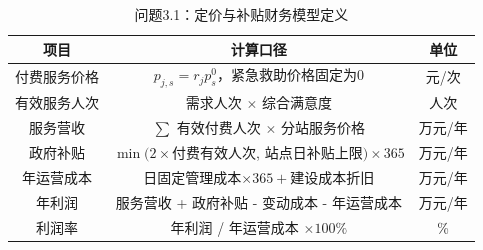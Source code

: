 \begin{table}[h]
\centering
\caption{问题3.1：定价与补贴财务模型定义}
\begin{tabular}{|c|c|c|}
\hline
项目 & 计算口径 & 单位 \\
\hline
付费服务价格 & $p_{j,s}=r_j p^0_s$，紧急救助价格固定为0 & 元/次 \\
有效服务人次 & 需求人次 $\times$ 综合满意度 & 人次 \\
服务营收 & $\sum$ 有效付费人次 $\times$ 分站服务价格 & 万元/年 \\
政府补贴 & $\min(2\times$付费有效人次, 站点日补贴上限$)\times365$ & 万元/年 \\
年运营成本 & 日固定管理成本$\times365+$建设成本折旧 & 万元/年 \\
年利润 & 服务营收 + 政府补贴 - 变动成本 - 年运营成本 & 万元/年 \\
利润率 & 年利润 / 年运营成本 $\times100\%$ & \% \\
\hline
\end{tabular}
\end{table}